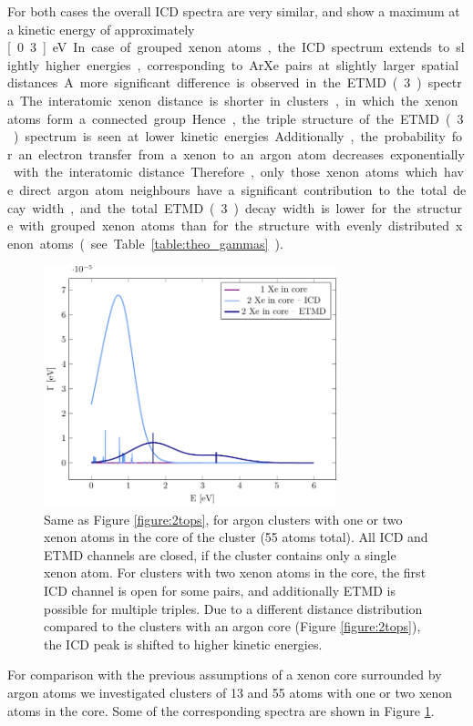 \documentclass[journal=jpccck,manuscript=article]{achemso}
\begin{document}
For both cases the overall ICD spectra are very similar, and show a maximum at a kinetic energy of approximately \unit[0.3]{eV}. 
In case of grouped xenon atoms, the ICD spectrum extends to slightly higher energies, corresponding to ArXe pairs at slightly larger spatial distances.
A more significant difference is observed in the ETMD(3) spectra. 
The interatomic xenon distance is shorter in clusters, in which the xenon atoms form a connected group.
Hence, the triple structure of the ETMD(3) spectrum is seen at lower kinetic energies. 
Additionally, the probability for an electron
transfer from a xenon to an argon atom decreases exponentially with the
interatomic distance. Therefore, only those xenon atoms which have direct
argon atom neighbours have a significant contribution to the
total decay width, and the total ETMD(3) decay width is lower for the structure with
grouped xenon atoms than for
the structure with evenly distributed xenon atoms (see Table \ref{table:theo_gammas}).

\begin{figure}[ht]
 \centering
 \includegraphics[width=8.5cm]{xe_3_in.pdf}
 \caption{Same as Figure \protect\ref{figure:2tops}, for argon clusters with
          one or two xenon atoms in the core of the cluster (55 atoms total). 
          All ICD and ETMD channels are closed, if the cluster contains only 
          a single xenon atom. For clusters with two xenon atoms
          in the core, the first ICD channel is open for some pairs,
          and additionally ETMD is possible for multiple triples. Due to a
          different distance distribution compared to the clusters with an argon
          core (Figure \protect\ref{figure:2tops}), 
          the ICD peak is shifted to higher kinetic energies.}
 \label{figure:xe_3_in}
\end{figure}
%
For comparison with the previous assumptions of a xenon core surrounded
by argon atoms we investigated clusters of 13 and 55 atoms with one or two
xenon atoms in the core. Some of the corresponding
spectra are shown in Figure \ref{figure:xe_3_in}.
\end{document}
